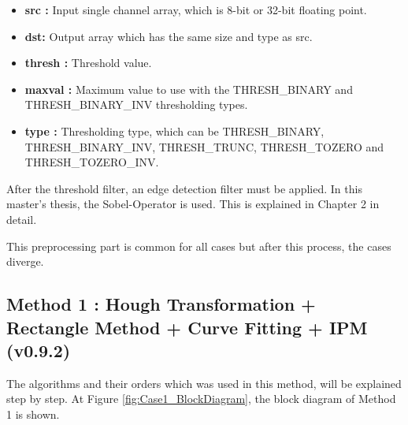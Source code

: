 \begin{itemize}

\item \textbf{src : }Input single channel array, which is 8-bit or 32-bit floating point.

\item \textbf{dst: }Output array which has the same size and type as src. 

\item \textbf{thresh : }Threshold value.

\item \textbf{maxval : }Maximum value to use with the THRESH\_BINARY and THRESH\_BINARY\_INV thresholding types.

\item \textbf{type : }Thresholding type, which can be THRESH\_BINARY, THRESH\_BINARY\_INV, THRESH\_TRUNC, THRESH\_TOZERO and THRESH\_TOZERO\_INV.

\end{itemize}






















After the threshold filter, an edge detection filter must be applied. In this master's thesis, the Sobel-Operator is used. This is explained in Chapter 2 in detail.
 
This preprocessing part is common for all cases but after this process, the cases diverge. 
 
%
\subsection{Method 1 : Hough Transformation + Rectangle Method + Curve Fitting + IPM (v0.9.2)}\label{sec:Case 1}

The algorithms and their orders which was used in this method, will be explained step by step. At Figure \ref{fig:Case1_BlockDiagram}, the block diagram of Method 1 is shown.

\emph{\color{blue}}

